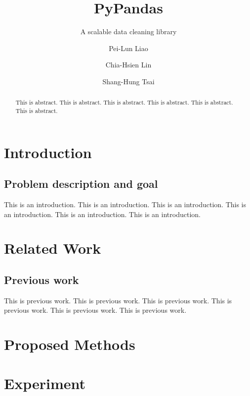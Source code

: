 \documentclass[sigconf]{acmart}
\begin{document}
\title{PyPandas}
\subtitle{A scalable data cleaning library}

\author{Pei-Lun Liao}

\author{Chia-Hsien Lin}

\author{Shang-Hung Tsai}

\begin{abstract}
This is abstract. 
This is abstract. 
This is abstract. 
This is abstract.
This is abstract.
This is abstract.

\end{abstract}

\maketitle

\section{Introduction}

\subsection{Problem description and goal}
This is an introduction.
This is an introduction.
This is an introduction.
This is an introduction.
This is an introduction.
This is an introduction.

\section{Related Work}
\subsection{Previous work}
This is previous work.
This is previous work.
This is previous work.
This is previous work.
This is previous work.
This is previous work.

\section{Proposed Methods}

\section{Experiment}
\end{document}
